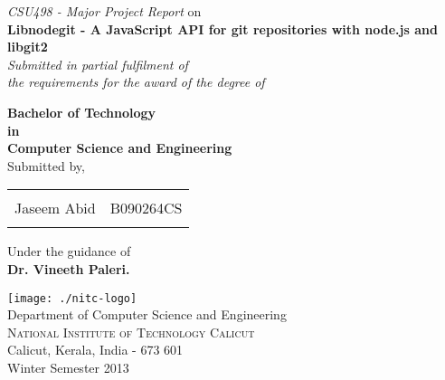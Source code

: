 \begin{titlepage}

\begin{center}

\textup{\textit{CSU498 - Major Project Report} on }\\[0.2in]

\Large \textbf {Libnodegit - A JavaScript API for git repositories with
node.js and libgit2}\\[0.5in]

       \small \emph{Submitted in partial fulfilment of\\
        the requirements for the award of the degree of}
        \vspace{.2in}

       {\bf Bachelor of Technology \\in\\ Computer Science and Engineering}\\[0.5in]

\normalsize Submitted by, \\
\begin{table}[h]
  \centering
  \begin{tabular}{lr}\hline \\
    Jaseem Abid & B090264CS \\ \\ \hline
  \end{tabular}
\end{table}

\vspace{.1in}
Under the guidance of \\
{\textbf{Dr. Vineeth Paleri.}}\\[0.2in]

\vfill

\texttt{[image: ./nitc-logo]}\\[0.1in]
\Large{Department of Computer Science and Engineering}\\
\normalsize
\textsc{National Institute of Technology Calicut}\\
Calicut, Kerala, India - 673 601 \\
\vspace{0.2cm}
Winter Semester 2013

\end{center}

\end{titlepage}
